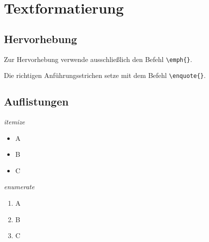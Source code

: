 \section{Textformatierung}

\subsection{Hervorhebung}

Zur Hervorhebung verwende ausschließlich den Befehl \lstinline!\emph{}!.

\noindent
Die richtigen Anführungsstrichen setze mit dem Befehl \lstinline!\enquote{}!.

\subsection{Auflistungen}

\hfill
\begin{minipage}{0.25\textwidth}
	\emph{itemize}
	\begin{itemize}
		\item A
		\item B
		\item C
	\end{itemize}
\end{minipage}
\hfill
\begin{minipage}{0.25\textwidth}
	\emph{enumerate}
	\begin{enumerate}
		\item A
		\item B
		\item C
	\end{enumerate}
\end{minipage}
\hfill
